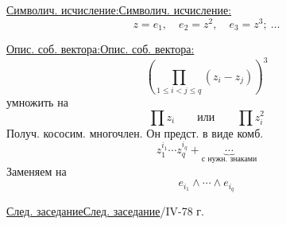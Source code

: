 \documentclass[11pt]{article}
\theoremstyle{definition}
\theoremstyle{remark}
\let\DiplomaticMathUnderline\underline
\renewcommand{\underline}[1]{\ifmmode\DiplomaticMathUnderline{#1}\else\uline{#1}\fi}
\begin{document}
\underline{Символич. исчисление:}
\begin{equation*}
z=e_1,\quad e_2=z^2,\quad e_3=z^3;\ \ldots
\end{equation*}

\underline{Опис. соб. вектора:}
\begin{equation*}
\left(\prod_{1\le i<j\le q}(z_i-z_j)\right)^3
\end{equation*}
умножить на
\begin{equation*}
\prod z_i\qquad\text{или}\qquad\prod z_i^2
\end{equation*}
Получ. кососим. многочлен. Он предст. в виде комб.
\begin{equation*}
z_1^{i_1}\cdots z_q^{i_q}+\underbrace{\cdots}_{\text{с нужн. знаками}}
\end{equation*}
Заменяем на
\begin{equation*}
e_{i_1}\wedge\cdots\wedge e_{i_q}
\end{equation*}

\underline{След. заседание} 4/IV-78 г.
\end{document}
